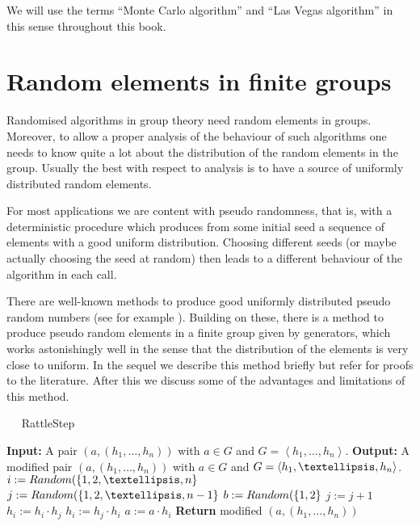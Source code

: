 We will use the terms ``Monte Carlo algorithm'' and ``Las Vegas
algorithm'' in this sense throughout this book.

\section{Random elements in finite groups}
\label{randomelts}

Randomised algorithms in group theory need random elements in groups.
Moreover, to allow a proper analysis of the behaviour of such
algorithms one needs to know quite a lot about the distribution of
the random elements in the group. Usually the best with respect to
analysis is to have a source of uniformly distributed random elements.

For most applications we are content with pseudo randomness, that is, with a
deterministic procedure which produces from some initial seed a sequence of 
elements with a good uniform distribution. Choosing different seeds (or
maybe actually choosing the seed at random) then leads to a different
behaviour of the algorithm in each call.

There are well-known methods to produce good uniformly distributed
pseudo random numbers (see for example \cite[Chapter~3]{AOCP2}).
Building on these, there is a method to produce pseudo random elements
in a finite group given by generators, which works astonishingly
well in the sense that the distribution of the elements is very close
to uniform. In the sequel we describe this method briefly but refer
for proofs to the literature. After this we discuss some of the
advantages and limitations of this method.

\begin{algorithm}
\caption{$\quad$ \sc RattleStep}
\label{rattlestep}
%
\begin{algorithmic}
\STATE \textbf{Input:} A pair $(a,(h_1, \ldots, h_n))$ with $a \in G$
and $G = \left< h_1, \ldots, h_n \right>$.
\STATE \textbf{Output:} A modified pair $(a,(h_1, \ldots, h_n))$ with $a \in G$
and $G = \left< \smash{h_1, \ldots, h_n} \right>$.
\vspace*{2mm}
\STATE $i := \textsc{Random}(\{ 1,2,\ldots,n\}$
\STATE $j := \textsc{Random}(\{1,2,\ldots,n-1\}$
\STATE $b := \textsc{Random}(\{1,2\}$
    \STATE $j := j + 1$
\ENDIF
{}
    \STATE $h_i := h_i \cdot h_j$
\ELSE
    \STATE $h_i := h_j \cdot h_i$
\ENDIF
\STATE $a := a \cdot h_i$
\STATE \textbf{Return} modified $(a,(h_1,\ldots,h_n))$
\end{algorithmic}
\end{algorithm}


